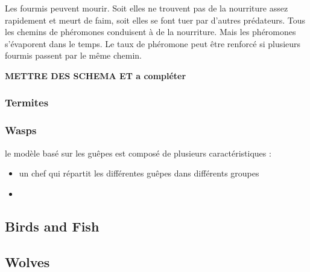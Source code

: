 Les fourmis peuvent mourir. Soit elles ne trouvent pas de la nourriture assez rapidement et meurt de faim, soit elles se font tuer par d'autres prédateurs.
Tous les chemins de phéromones conduisent à de la nourriture. Mais les phéromones s'évaporent dans le temps. Le taux de phéromone peut être renforcé si plusieurs fourmis passent par le même chemin.

\textbf{METTRE DES SCHEMA ET a compléter}

\subsubsection{Termites}

\subsubsection{Wasps}

le modèle basé sur les guêpes est composé de plusieurs caractéristiques :
\begin{itemize}
\item un chef qui répartit les différentes guêpes dans différents groupes
\item 
\end{itemize}

\subsection{Birds and Fish}

\subsection{Wolves}
